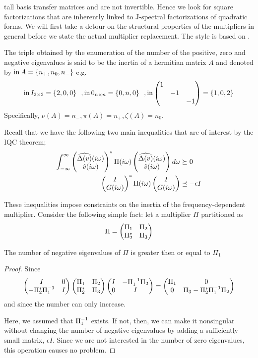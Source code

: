 tall basis transfer matrices and are not invertible. Hence we look for square factorizations that are inherently 
linked to J-spectral factorizations of quadratic forms. We will first take a detour on the structural properties 
of the multipliers in general before we state the actual multiplier replacement. The style is based on \cite{helmersson2}.
\begin{define}[Inertia] The triple obtained by the enumeration of the number of the positive, zero and negative 
eigenvalues is said to be the inertia of a hermitian matrix $A$ and denoted by $\operatorname{in} A = \{n_+,n_0,n_-\}$ e.g. 
\[
\inertia I_{2\times 2} = \{2,0,0\}\ \ , \inertia 0_{n\times n} = \{0,n,0\} \ \ ,\inertia \pmatr{1 &&\\&-1&\\&&-1} = \{1,0,2\}
\]
Specifically, $\nu(A) = n_-, \pi(A) = n_+, \zeta(A) = n_0$.
\end{define}

Recall that we have the following two main inequalities that are of interest by the IQC theorem;
\begin{align}\label{eq:interlude1}
\int_{-\infty}^\infty{\begin{pmatrix}\widehat{\Delta(v)}(i\omega)\\\hat{v}(i\omega)\end{pmatrix}^*\Pi(i\omega)\begin{pmatrix}\widehat{\Delta(v)}(i\omega)\\\hat{v}(i\omega)\end{pmatrix}d\omega} &\succeq 0\\
\label{eq:interlude2}
\begin{pmatrix}I\\G(i\omega)\end{pmatrix}^*\Pi(i\omega)\begin{pmatrix}I\\G(i\omega)\end{pmatrix} &\preceq -\epsilon I
\end{align}

These inequalities impose constraints on the inertia of the frequency-dependent multiplier. Consider the following 
simple fact: let a multiplier $\Pi$ partitioned as
\begin{equation}
\Pi = \begin{pmatrix}\Pi_1&\Pi_2\\\Pi_2^* &\Pi_3\end{pmatrix}
\label{eq:Pipartition}
\end{equation}


\begin{lem}\label{lem:negnag}
The number of negative eigenvalues of $\Pi$ is greater then or equal to $\Pi_1$ 
\end{lem}


\begin{proof}
Since
\[
\begin{pmatrix}I&0\\-\Pi_2^*\Pi_1^{-1} &I\end{pmatrix}\begin{pmatrix}\Pi_1&\Pi_2\\ \Pi_2^* &\Pi_3\end{pmatrix}
\begin{pmatrix}I&-\Pi_1^{-1}\Pi_2\\0&I\end{pmatrix} = \begin{pmatrix}\Pi_1&0\\0 &\Pi_3-\Pi_2^*\Pi_1^{-1}\Pi_2\end{pmatrix}
\]
and since the number can only increase. 

Here, we assumed that $\Pi_1^{-1}$ exists. If not, then, we can make it nonsingular without changing the number of 
negative eigenvalues by adding a sufficiently small matrix, $\epsilon I$. Since we are not interested in the number 
of zero eigenvalues, this operation causes no problem.
\end{proof}

